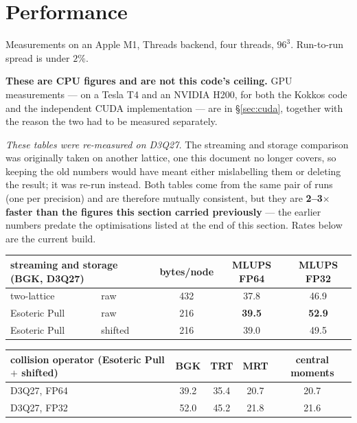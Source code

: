 \documentclass[11pt,a4paper]{article}
\begin{document}
\section{Performance}
\label{sec:perf}

Measurements on an Apple M1, Threads backend, four threads, $96^3$. Run-to-run
spread is under $2\%$.

\textbf{These are CPU figures and are not this code's ceiling.} GPU
measurements --- on a Tesla T4 and an NVIDIA H200, for both the Kokkos code and
the independent CUDA implementation --- are in \S\ref{sec:cuda}, together with
the reason the two had to be measured separately.

\emph{These tables were re-measured on D3Q27.} The streaming and storage
comparison was originally taken on another lattice, one this document no longer
covers, so keeping the old numbers would have meant either mislabelling them or
deleting the result; it was re-run instead. Both
tables come from the same pair of runs (one per precision) and are therefore
mutually consistent, but they are \textbf{2--3$\times$ faster than the figures
this section carried previously} --- the earlier numbers predate the
optimisations listed at the end of this section. Rates below are the current
build.

\begin{center}\small
\begin{tabular}{llccc}
\toprule
\multicolumn{2}{l}{streaming and storage (BGK, D3Q27)} & bytes/node & MLUPS FP64 & MLUPS FP32 \\
\midrule
two-lattice   & raw     & 432 & 37.8 & 46.9 \\
Esoteric Pull & raw     & 216 & \textbf{39.5} & \textbf{52.9} \\
Esoteric Pull & shifted & 216 & 39.0 & 49.5 \\
\bottomrule
\end{tabular}
\end{center}

\begin{center}\small
\begin{tabular}{lcccc}
\toprule
collision operator (Esoteric Pull $+$ shifted) & BGK & TRT & MRT & central moments \\
\midrule
D3Q27, FP64 & 39.2 & 35.4 & 20.7 & 20.7 \\
D3Q27, FP32 & 52.0 & 45.2 & 21.8 & 21.6 \\
\bottomrule
\end{tabular}
\end{center}
\end{document}
